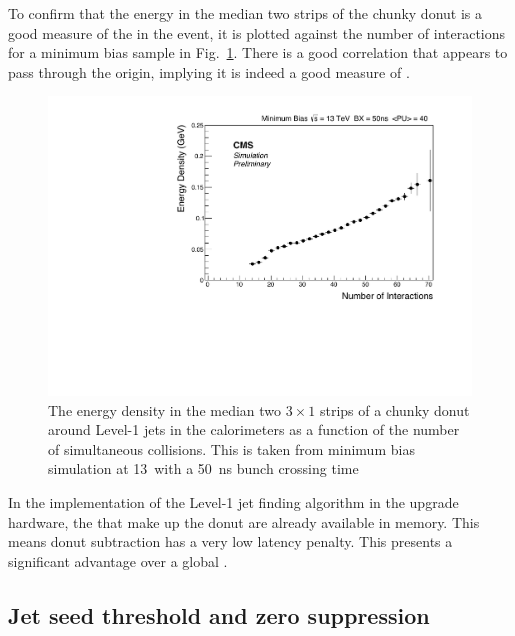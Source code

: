 To confirm that the energy in the median two strips of the  chunky
donut is a good measure of the \PU in the event, it is plotted against
the number of interactions for a minimum bias \MC sample in
Fig.~\ref{fig:donut_nint}. There is a good correlation that appears to
pass through the origin, implying it is indeed a good measure of \PU. 

\begin{figure}
	\begin{center}
		\includegraphics[width=0.8\linewidth]{figs/trigger/threestrips}
  \caption{The energy density in the median two $3\times 1$ \TT strips
  of a chunky donut around Level-1 jets in the \CMS calorimeters as a
  function of the number of simultaneous collisions. This is taken
  from minimum bias \MC simulation at 13~\tev with a 50~ns bunch
  crossing time}
	\label{fig:donut_nint}
	\end{center}
\end{figure}

In the implementation of the Level-1 jet finding algorithm in the
upgrade hardware, the \TTs that make up the donut are already
available in memory. This means donut subtraction has a very low
latency penalty. This presents a significant advantage over a global
\PUS. 

\subsection{Jet seed threshold and zero suppression}

